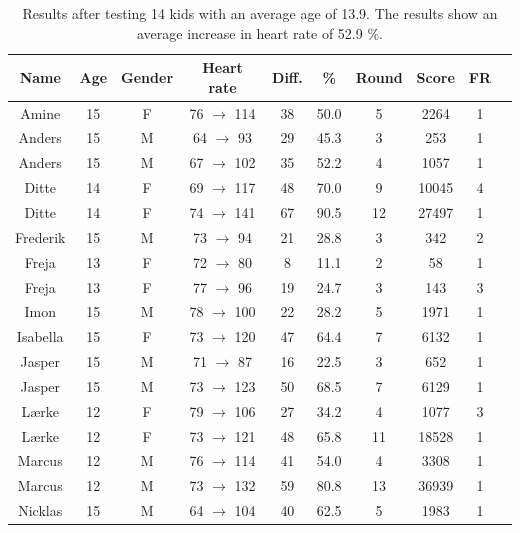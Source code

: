 \documentclass[11pt]{report}
\begin{document}
\begin{table}[H]
\centering
\caption[Test results]{Results after testing 14 kids with an average age of 13.9. The results show an average increase in heart rate of 52.9 \%.}
\begin{tabular}{ | c | c | c | c | c | c | c | c | c | c |}
\hline
\textbf{Name} & \textbf{Age} & \textbf{Gender} & \textbf{Heart rate} & \textbf{Diff.} & \textbf{\%} & \textbf{Round} & \textbf{Score} & \textbf{FR}\\ \hline
Amine & 15 & F & 76 $\rightarrow$ 114 & 38 & 50.0 & 5 & 2264 & 1\\ \hline 
Anders & 15 & M & 64 $\rightarrow$ 93 &  29 & 45.3 & 3 & 253 & 1\\ \hline 
Anders & 15 & M & 67 $\rightarrow$ 102  & 35 & 52.2  & 4 & 1057 & 1\\ \hline 
Ditte & 14 & F & 69 $\rightarrow$ 117 & 48  & 70.0 & 9 & 10045 & 4\\ \hline 
Ditte & 14 & F & 74 $\rightarrow$ 141 & 67 & 90.5 & 12 & 27497 & 1\\ \hline 
Frederik & 15 & M & 73 $\rightarrow$ 94 & 21 & 28.8 & 3 & 342 & 2\\ \hline 
Freja & 13 & F & 72 $\rightarrow$ 80 &  8 & 11.1 & 2 & 58 & 1\\ \hline 
Freja & 13 & F & 77 $\rightarrow$ 96 &  19 & 24.7 & 3 & 143 & 3\\ \hline 
Imon & 15 & M & 78 $\rightarrow$ 100 & 22 & 28.2 & 5 & 1971 & 1\\ \hline 
Isabella & 15 & F & 73 $\rightarrow$ 120 & 47 & 64.4 & 7 & 6132 & 1\\ \hline 
Jasper & 15 & M & 71 $\rightarrow$ 87  & 16 & 22.5 & 3 & 652 & 1\\ \hline 
Jasper & 15 & M & 73 $\rightarrow$ 123 & 50 & 68.5 & 7 & 6129 & 1\\ \hline 
L\ae rke & 12 & F & 79 $\rightarrow$ 106 & 27 & 34.2 & 4 & 1077 & 3\\ \hline 
L\ae rke & 12 & F & 73 $\rightarrow$ 121 & 48 & 65.8 & 11 & 18528 & 1\\ \hline 
Marcus & 12 & M & 76 $\rightarrow$ 114 & 41 & 54.0 & 4 & 3308 & 1\\ \hline 
Marcus & 12 & M & 73 $\rightarrow$ 132 & 59 & 80.8 & 13 & 36939 & 1\\ \hline 
Nicklas & 15 & M & 64 $\rightarrow$ 104 & 40 & 62.5 & 5 & 1983 & 1\\ \hline 

\end{tabular}
\end{table}
\end{document}
